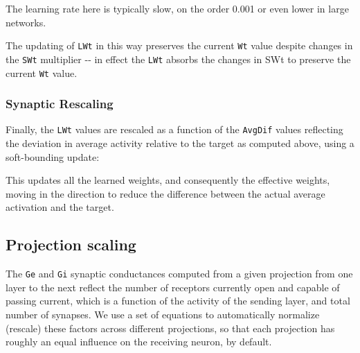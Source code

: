 \documentclass[11pt,twoside]{article}
\newif\myifpdf
\begin{document}
The learning rate here is typically slow, on the order 0.001 or even
lower in large networks.

The updating of \texttt{LWt} in this way preserves the current
\texttt{Wt} value despite changes in the \texttt{SWt} multiplier -\/- in
effect the \texttt{LWt} absorbs the changes in SWt to preserve the
current \texttt{Wt} value.

\hypertarget{synaptic-rescaling}{%
\subsubsection{Synaptic Rescaling}\label{synaptic-rescaling}}

Finally, the \texttt{LWt} values are rescaled as a function of the
\texttt{AvgDif} values reflecting the deviation in average activity
relative to the target as computed above, using a soft-bounding update:

\begin{Shaded}
\begin{Highlighting}[]
    \OperatorTok{\textgreater{}}  \OperatorTok{\{}
\OperatorTok{+=}\OperatorTok{*} \OperatorTok{(} \OperatorTok{{-}}\OperatorTok{)} \OperatorTok{*}\OperatorTok{*}
    \OperatorTok{\}}  \OperatorTok{\{}
\OperatorTok{+=}\OperatorTok{*}\OperatorTok{*}\OperatorTok{*}
    \OperatorTok{\}}
\OperatorTok{=}\OperatorTok{*}\OperatorTok{(}\OperatorTok{)}
\end{Highlighting}
\end{Shaded}

This updates all the learned weights, and consequently the effective
weights, moving in the direction to reduce the difference between the
actual average activation and the target.

\hypertarget{projection-scaling}{%
\subsection{Projection scaling}\label{projection-scaling}}

The \texttt{Ge} and \texttt{Gi} synaptic conductances computed from a
given projection from one layer to the next reflect the number of
receptors currently open and capable of passing current, which is a
function of the activity of the sending layer, and total number of
synapses. We use a set of equations to automatically normalize (rescale)
these factors across different projections, so that each projection has
roughly an equal influence on the receiving neuron, by default.
\end{document}
